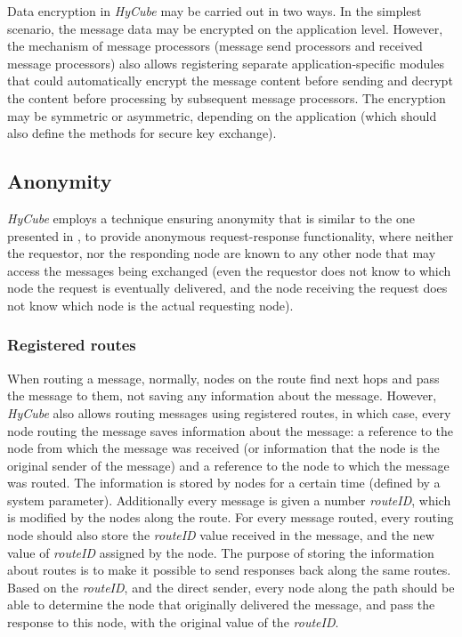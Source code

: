 Data encryption in \emph{HyCube} may be carried out in two ways. In the simplest scenario, the message data may be encrypted on the application level. However, the mechanism of message processors (message send processors and received message processors) also allows registering separate application-specific modules that could automatically encrypt the message content before sending and decrypt the content before processing by subsequent message processors. The encryption may be symmetric or asymmetric, depending on the application (which should also define the methods for secure key exchange).




\subsection{Anonymity}
\label{sec:anonymity}

\emph{HyCube} employs a technique ensuring anonymity that is similar to the one presented in \cite{freenet}, to provide anonymous request-response functionality, where neither the requestor, nor the responding node are known to any other node that may access the messages being exchanged (even the requestor does not know to which node the request is eventually delivered, and the node receiving the request does not know which node is the actual requesting node).




\subsubsection{Registered routes}

When routing a message, normally, nodes on the route find next hops and pass the message to them, not saving any information about the message. However, \emph{HyCube} also allows routing messages using registered routes, in which case, every node routing the message saves information about the message: a reference to the node from which the message was received (or information that the node is the original sender of the message) and a reference to the node to which the message was routed. The information is stored by nodes for a certain time (defined by a system parameter). Additionally every message is given a number \emph{routeID}, which is modified by the nodes along the route. For every message routed, every routing node should also store the \emph{routeID} value received in the message, and the new value of \emph{routeID} assigned by the node. The purpose of storing the information about routes is to make it possible to send responses back along the same routes. Based on the \emph{routeID}, and the direct sender, every node along the path should be able to determine the node that originally delivered the message, and pass the response to this node, with the original value of the \emph{routeID}.

